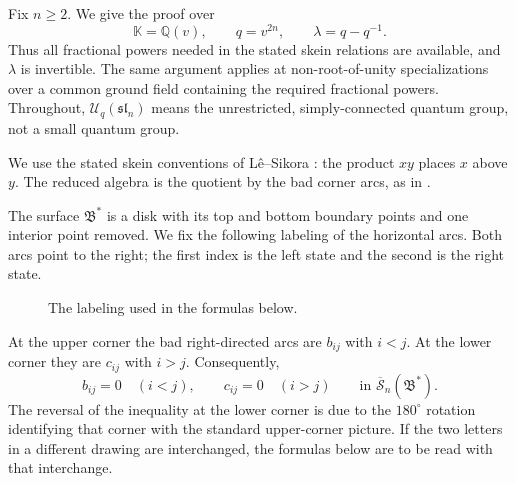 \documentclass[11pt]{article}
\theoremstyle{remark}
\newcommand{\kk}{\mathbb{K}}
\newcommand{\UU}{\mathcal U_q}
\newcommand{\rSk}{\overline{\mathscr S}_n}
\newcommand{\Bstar}{\mathfrak B^{*}}
\newcommand{\slie}{\mathfrak{sl}_n}
\begin{document}
Fix $n\geq 2$.  We give the proof over
\[
  \kk=\mathbb Q(v),\qquad q=v^{2n},\qquad
  \lambda=q-q^{-1}.
\]
Thus all fractional powers needed in the stated skein relations are
available, and $\lambda$ is invertible.  The same argument applies
at non-root-of-unity specializations over a common ground field
containing the required fractional powers.  Throughout,
$\UU(\slie)$ means the unrestricted, simply-connected quantum group,
not a small quantum group.

We use the stated skein conventions of L\^e--Sikora
\cite{LS}: the product $xy$ places $x$ above $y$.
The reduced algebra is the quotient by the bad corner arcs, as in
\cite[Section~7.1]{LY}.

The surface $\Bstar$ is a disk with its top and bottom boundary
points and one interior point removed.  We fix the following
labeling of the horizontal arcs.  Both arcs point to the right;
the first index is the left state and the second is the right state.

\begin{figure}[ht]
\centering
{}
\caption{The labeling used in the formulas below.}
\label{fig:bigon}
\end{figure}

At the upper corner the bad right-directed arcs are $b_{ij}$ with
$i<j$.  At the lower corner they are $c_{ij}$ with $i>j$.
Consequently,
\begin{equation}\label{eq:triangular}
 b_{ij}=0\quad(i<j),\qquad
 c_{ij}=0\quad(i>j)
 \qquad\text{in }\rSk(\Bstar).
\end{equation}
The reversal of the inequality at the lower corner is due to the
$180^\circ$ rotation identifying that corner with the standard
upper-corner picture.  If the two letters in a different drawing
are interchanged, the formulas below are to be read with that
interchange.
\end{document}
